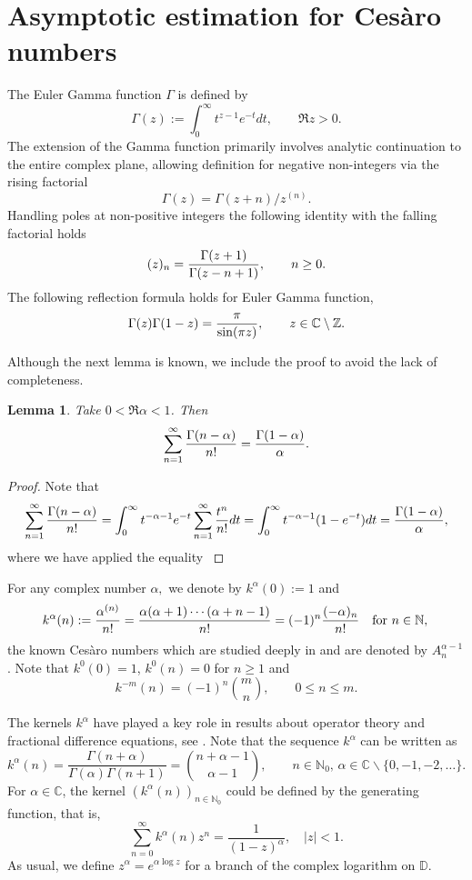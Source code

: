 \documentclass[a4paper,12pt]{amsart}
\def\N{\mathbb N}
\def\CC{\mathbb C}
\def\CC{\mathbb C}
\def\DD{\mathbb D}
\def\ZZ{\mathbb Z}
\newtheorem{lemma}[thm]{Lemma}
\theoremstyle{definition}
\theoremstyle{remark}
\begin{document}
\section{Asymptotic estimation for Ces\`aro numbers}
The Euler Gamma function $\Gamma$ is defined by
$$
\Gamma(z):=\int_0^\infty {t^{z-1}}e^{-t}dt, \qquad \Re z>0.
$$
The extension of the Gamma function primarily involves analytic continuation to the entire complex plane, allowing definition for negative non-integers via the rising factorial $$\Gamma (z)=\Gamma (z+n)/z^{(n)}.$$
Handling poles at non-positive integers the following identity with the falling factorial holds
\[
(z)_n={\Gamma(z+1)\over \Gamma(z-n+1)}, \qquad n\ge 0.
\]
  The  following reflection formula holds for Euler Gamma function,
\begin{equation}
    \Gamma(z)\Gamma(1-z)={\pi \over \sin(\pi z)}, \qquad z\in \CC\setminus \ZZ.
\end{equation}

Although the next lemma is known, we include the proof to avoid the lack of completeness.
\begin{lemma}\label{121} Take $0<\Re \alpha<1$. Then
$$
\sum_{n=1}^\infty {\Gamma(n-\alpha)\over n!}= {\Gamma(1-\alpha)\over \alpha}.
$$
\end{lemma}

\begin{proof} Note that
$$
\sum_{n=1}^\infty {\Gamma(n-\alpha)\over n!}=\int_0^\infty t^{-\alpha-1}e^{-t}\sum_{n=1}^\infty {t^n\over n!}dt= \int_0^\infty t^{-\alpha-1}(1-e^{-t})dt={\Gamma(1-\alpha)\over \alpha},
$$
where we have applied the equality \cite[3.434(1)]{GR}
\end{proof}

	For any complex number $\alpha,$ we denote by $k^{\alpha}(0):=1$ and \begin{equation}\label{definition} k^{\alpha}(n):={\alpha ^{(n)}\over n!}=\frac{\alpha(\alpha+1)\cdots(\alpha+n-1)}{n!}= (-1)^n {(-\alpha)_n\over n!}\quad \text{for }n\in\N,\,\end{equation} the known Ces\`aro numbers which are studied deeply in \cite[Vol. I, p.77]{Zygmund} and are denoted by $A_{n}^{\alpha-1}$. Note that $k^0(0)=1$,  $k^0(n)=0$ for $n\ge 1$ and
    $$
    k^{-m}(n)=(-1)^n{m \choose n}, \qquad 0\le n\le m.
    $$

    The kernels $k^{\alpha}$ have played a key role in results about operator theory and fractional difference equations, see \cite{ALMV, Lizama}. Note that the sequence $k^\alpha$ can be written as $$k^{\alpha}(n)=\frac{\Gamma(n+\alpha)}{\Gamma(\alpha)\Gamma(n+1)}={n+\alpha-1\choose \alpha-1} ,\qquad n\in\N_{0},\,\alpha\in \CC\backslash\{0,-1,-2,\ldots\}.$$
 For $\alpha\in \CC$, the kernel $(k^{\alpha}(n))_{n\in\N_0}$ could be defined by the generating function, that is, \begin{equation}\label{generating}
\displaystyle\sum_{n=0}^{\infty}k^{\alpha}(n)z^n=\frac{1}{(1-z)^{\alpha}},\quad |z|<1.
 \end{equation}
 As usual, we define $z^{\alpha}=e^{\alpha\log z}$ for a branch of the complex logarithm on $\DD$.
\end{document}
